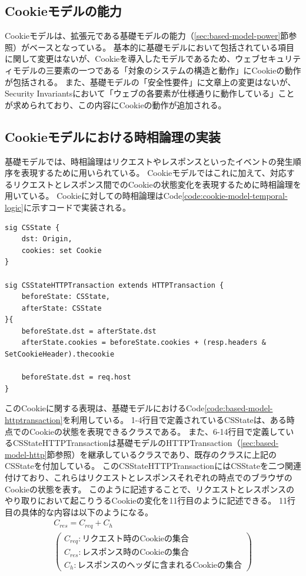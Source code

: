 \documentclass[12pt,a4paper]{jbook}
\begin{document}
\subsection{Cookieモデルの能力}
Cookieモデルは、拡張元である基礎モデルの能力（\ref{sec:based-model-power}節参照）がベースとなっている。
基本的に基礎モデルにおいて包括されている項目に関して変更はないが、Cookieを導入したモデルであるため、ウェブセキュリティモデルの三要素の一つである「対象のシステムの構造と動作」にCookieの動作が包括される。
また、基礎モデルの「安全性要件」に文章上の変更はないが、Security Invariantsにおいて「ウェブの各要素が仕様通りに動作している」ことが求められており、この内容にCookieの動作が追加される。

\subsection{Cookieモデルにおける時相論理の実装}
基礎モデルでは、時相論理はリクエストやレスポンスといったイベントの発生順序を表現するために用いられている。
Cookieモデルではこれに加えて、対応するリクエストとレスポンス間でのCookieの状態変化を表現するために時相論理を用いている。
Cookieに対しての時相論理はCode\ref{code:cookie-model-temporal-logic}に示すコードで実装される。
\begin{lstlisting}[caption=Cookieに対する時相論理, label=code:cookie-model-temporal-logic]
sig CSState {
	dst: Origin,
	cookies: set Cookie
}

sig CSStateHTTPTransaction extends HTTPTransaction {
	beforeState: CSState,
	afterState: CSState
}{
	beforeState.dst = afterState.dst
	afterState.cookies = beforeState.cookies + (resp.headers & SetCookieHeader).thecookie
	
	beforeState.dst = req.host
}
\end{lstlisting}
\color{red}
このCookieに関する表現は、基礎モデルにおけるCode\ref{code:based-model-httptransaction}を利用している。
1-4行目で定義されているCSStateは、ある時点でのCookieの状態を表現できるクラスである。
また、6-14行目で定義しているCSStateHTTPTransactionは基礎モデルのHTTPTransaction（\ref{sec:based-model-http}節参照）を継承しているクラスであり、既存のクラスに上記のCSStateを付加している。
このCSStateHTTPTransactionにはCSStateを二つ関連付けており、これらはリクエストとレスポンスそれぞれの時点でのブラウザのCookieの状態を表す。
このように記述することで、リクエストとレスポンスのやり取りにおいて起こりうるCookieの変化を11行目のように記述できる。
11行目の具体的な内容は以下のようになる。
\begin{eqnarray*}
& C_{res} = C_{req} + C_{h} &\\
& \left(
\begin{array}{l}
	C_{req} : \mbox{リクエスト時のCookieの集合}\\
	C_{res} : \mbox{レスポンス時のCookieの集合}\\
	C_{h} : \mbox{レスポンスのヘッダに含まれるCookieの集合}
\end{array}
\right) &
\end{eqnarray*}
\end{document}
